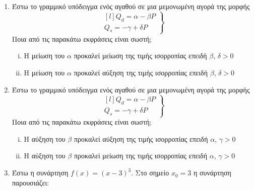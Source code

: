


\everymath{\displaystyle}
\pagestyle{askhseis}





\begin{center}
  \minibox{\large\bfseries \textcolor{Col1}{Θέματα}}
\end{center}

\vspace{\baselineskip}

\begin{enumerate}
  \item Έστω το γραμμικό υπόδειγμα ενός αγαθού σε μια μεμονωμένη αγορά της μορφής
    \[
      \left.
        \begin{matrix*}[l]
          Q_{d}= \alpha - \beta P \\
          Q_{s}=- \gamma + \delta P
        \end{matrix*} 
      \right\}
    \] 
    Ποια από τις παρακάτω εκφράσεις είναι σωστή;
    \begin{enumerate}[i)]
      \item Η μείωση του $\alpha$ προκαλεί μείωση της τιμής ισορροπίας επειδή $\beta$,
        $\delta > 0$ 
      \item Η μείωση του $\alpha$ προκαλεί αύξηση της τιμής ισορροπίας επειδή $\beta$,
        $\delta > 0$
    \end{enumerate}

  \item Έστω το γραμμικό υπόδειγμα ενός αγαθού σε μια μεμονωμένη αγορά της μορφής
    \[
      \left.
        \begin{matrix*}[l]
          Q_{d}= \alpha - \beta P \\
          Q_{s}=- \gamma + \delta P
        \end{matrix*} 
      \right\}
    \]
    Ποια από τις παρακάτω εκφράσεις είναι σωστή;
    \begin{enumerate}[i)]
      \item Η αύξηση  του $\beta$ προκαλεί αύξηση της τιμής ισορροπίας επειδή $\alpha$,
        $\gamma > 0$ 
      \item Η αύξηση  του $\beta$ προκαλεί μείωση της τιμής ισορροπίας επειδή $\alpha$,
        $\gamma > 0$
    \end{enumerate}

  \item Έστω η συνάρτηση $ f(x) = (x-3)^{3} $. Στο σημείο $ x_{0} = 3 $ η συνάρτηση 
    παρουσιάζει:


\end{enumerate}
